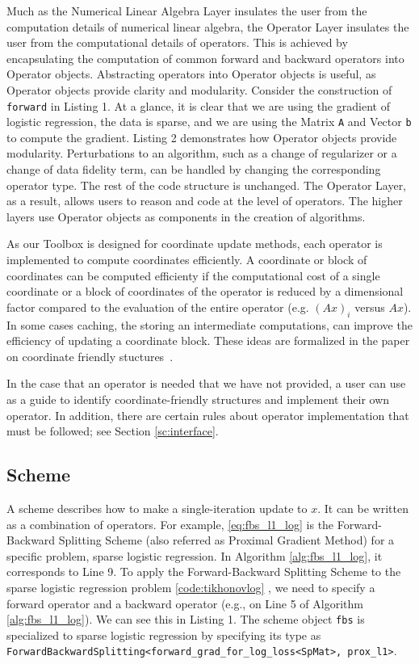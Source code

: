 Much as the Numerical Linear Algebra Layer insulates the user from the computation details of numerical linear algebra, the Operator Layer insulates the user from the computational details of operators. This is achieved by encapsulating the computation of common forward and backward operators into Operator objects. Abstracting operators into Operator objects is useful, as Operator objects provide clarity and modularity. Consider the construction of  \texttt{forward} in Listing 1. At a glance, it is clear that we are using the gradient of logistic regression, the data is sparse, and we are using the Matrix \texttt{A} and Vector \texttt{b} to compute the gradient. Listing 2 demonstrates how Operator objects provide modularity. Perturbations to an algorithm, such as a change of regularizer or a change of data fidelity term, can be handled by changing the corresponding operator type. The rest of the code structure is unchanged. The Operator Layer, as a result, allows users to reason and code at the level of operators. 
The higher layers use Operator objects as components in the creation of algorithms.
 
As our Toolbox is designed for coordinate update methods, each operator is implemented to compute coordinates efficiently.
 A coordinate or block of coordinates can be computed efficienty if the computational cost of a single coordinate or a block of coordinates of the operator is reduced by a dimensional factor compared to the evaluation of the entire operator (e.g. $(Ax)_i$ versus $Ax$). 
 In some cases caching, the storing an intermediate computations, can improve the efficiency of updating a coordinate block. These ideas are formalized in the paper on coordinate friendly stuctures~\citep{PengWuXuYanYin2016_coordinate}.

In the case that an operator is needed that we have not provided, a user can use~\citep{PengWuXuYanYin2016_coordinate} as a guide to identify coordinate-friendly structures and implement their own operator. In addition, there are certain rules about operator implementation that must be followed; see Section \ref{sc:interface}.


\subsection{Scheme}
A scheme describes how to make a single-iteration update to $x$.
It can be written as a combination of operators. For example, \eqref{eq:fbs_l1_log} is the Forward-Backward Splitting Scheme (also referred as Proximal Gradient Method) for a specific problem, sparse logistic regression. In Algorithm \ref{alg:fbs_l1_log}, it corresponds to Line 9. To apply the Forward-Backward Splitting Scheme to the sparse logistic regression problem \ref{code:tikhonovlog} , we need to specify a forward operator and a backward operator (e.g., on Line 5 of Algorithm \ref{alg:fbs_l1_log}). We can see this in Listing 1.
The scheme object \texttt{fbs} is specialized to sparse logistic regression by specifying its type as \texttt{ForwardBackwardSplitting<forward\_grad\_for\_log\_loss<SpMat>, prox\_l1>}.

